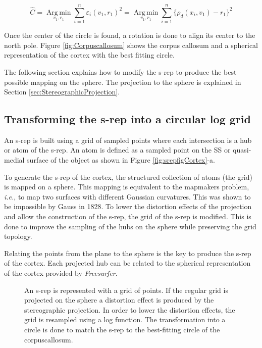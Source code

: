 \documentclass[a4paper,twoside]{article}
\begin{document}
\begin{equation}  
  \hat{C} = \operatorname*{Arg\,min}_{v_1, r_1} \sum_{i=1}^{n} \varepsilon_i ( v_1 , r_1 )^2 = \operatorname*{Arg\,min}_{v_1, r_1} \sum_{i=1}^{n}\{\rho_d(x_i, v_1) - r_1 \}^2
  \label{equ:optimalcircle}
\end{equation}

Once the center of the circle is found, 
a rotation is done to align its center to the north pole. 
Figure \ref{fig:Corpuscallosum} shows the corpus callosum and a spherical representation 
of the cortex with the best fitting circle. 

The following section explains how to modify the s-rep 
to produce the best possible mapping on the sphere. 
The projection to the sphere is explained in Section \ref{sec:StereographicProjection}.

\subsection{Transforming the s-rep into a circular log grid}

An s-rep is built using a grid of sampled points where
each intersection is a hub or atom of the s-rep. 
An atom is defined as a sampled point on the SS or quasi-medial surface of the object as shown in Figure \ref{fig:srepfigCortex}-a.

To generate the s-rep of the cortex, the structured collection of atoms (the grid) is mapped on a sphere.
This mapping is equivalent to the mapmakers problem, \textit{i.e.}, to map two surfaces with
different Gaussian curvatures. This was shown to be impossible by Gauss in 1828.
To lower the distortion effects of the projection and allow the construction of the s-rep, 
the grid of the s-rep is modified.
This is done to improve the sampling of the hubs on the sphere while preserving the grid topology.

Relating the points from the plane to the sphere is the key to produce the s-rep of the cortex. 
Each projected hub can be related to the spherical representation of the cortex provided by \textit{Freesurfer}.

\begin{figure}[h!]
 \centering 
 \caption[Resampling of the s-rep.]{An s-rep is represented with a grid of points. If the regular grid is projected on the sphere
          a distortion effect is produced by the stereographic projection. In order to lower the distortion effects, the grid is resampled
          using a log function. The transformation into a circle is done to match the s-rep to the best-fitting circle of the corpuscallosum.}
 \label{fig:gridTransformation}  
\end{figure}
\end{document}
